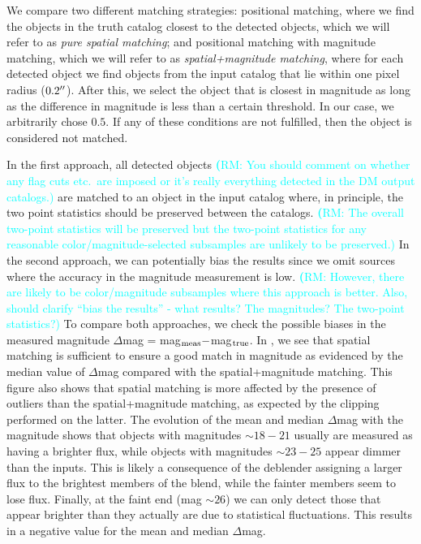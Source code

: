 \documentclass[twocolumn]{aastex62}
\newcommand{\rachel}[1]{{\textcolor{cyan}{{\textbf (RM: #1)}}}}
\begin{document}
We compare two different matching strategies: positional matching, where we find the objects in the truth catalog closest to the detected objects, which we will refer to as \textit{pure spatial matching}; and positional matching with magnitude matching, which we will refer to as \textit{spatial+magnitude matching}, where for each detected object we find objects from the input catalog that lie within one pixel radius ($0.2 \mbox{$^{\prime\prime}$}$). After this, we select the object that is closest in magnitude as long as the difference in magnitude is less than a certain threshold. In our case, we arbitrarily chose $0.5$. If any of these conditions are not fulfilled, then the object is considered not matched.

In the first approach, all detected objects \rachel{You should comment on whether any flag cuts etc.\ are imposed or it's really everything detected in the DM output catalogs.} are matched to an object in the input catalog where, in principle, the two point statistics should be preserved between the catalogs. \rachel{The overall two-point statistics will be preserved but the two-point statistics for any reasonable color/magnitude-selected subsamples are unlikely to be preserved.} In the second approach, we can potentially bias the results since we omit sources where the accuracy in the magnitude measurement is low. \rachel{However, there are likely to be color/magnitude subsamples where this approach is better.  Also, should clarify ``bias the results'' - what results?  The magnitudes?  The two-point statistics?} To compare both approaches, we check the possible biases in the measured magnitude $\Delta$mag = mag$_{\rm meas} - $mag$_{\rm true}$. In , we see that spatial matching is sufficient to ensure a good match in magnitude as evidenced by the median value of $\Delta$mag compared with the spatial+magnitude matching. This figure also shows that spatial matching is more affected by the presence of outliers than the spatial+magnitude matching, as expected by the clipping performed on the latter. The evolution of the mean and median $\Delta$mag with the magnitude shows that objects with magnitudes $\sim 18-21$ usually are measured as having a brighter flux, while objects with magnitudes $\sim 23-25$ appear dimmer than the inputs. This is likely a consequence of the deblender assigning a larger flux to the brightest members of the blend, while the fainter members seem to lose flux. Finally, at the faint end (mag $\sim 26$) we can only detect those that appear brighter than they actually are due to statistical fluctuations. This results in a negative value for the mean and median $\Delta$mag.
\end{document}
